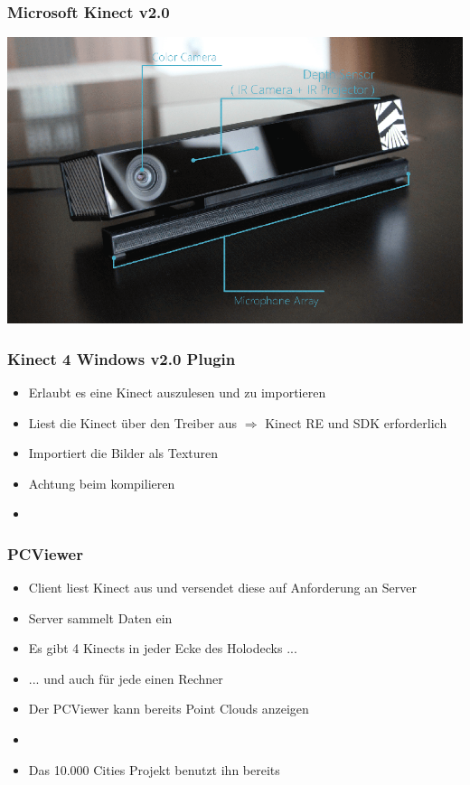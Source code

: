 \documentclass[18pt]{beamer}
\begin{document}
\begin{frame}
	\frametitle{Microsoft Kinect v2.0} 
	\includegraphics[width=0.7\paperwidth]{img/Kinectv2}
\end{frame}

\begin{frame}
	\frametitle{Kinect 4 Windows v2.0 Plugin} 
	\begin{itemize}
		\item Erlaubt es eine Kinect auszulesen und zu importieren
		\item Liest die Kinect über den Treiber aus $\Rightarrow$ Kinect RE und SDK erforderlich
		\item Importiert die Bilder als Texturen
		\item Achtung beim kompilieren
		\item {}
	\end{itemize}

\end{frame}

\begin{frame}
	\frametitle{PCViewer} 
	\begin{itemize}
		\item Client liest Kinect aus und versendet diese auf Anforderung an Server
		\item Server sammelt Daten ein
		\item Es gibt 4 Kinects in jeder Ecke des Holodecks ...
		\pause
		\item ... und auch für jede einen Rechner
		\item Der PCViewer kann bereits Point Clouds anzeigen
		\item {}
		\pause
		\item Das 10.000 Cities Projekt benutzt ihn bereits
	\end{itemize}
\end{frame}
\end{document}
